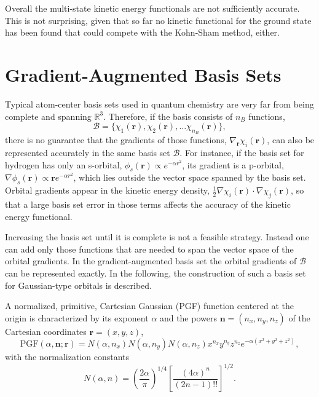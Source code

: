 \documentclass[journal=jacsat,manuscript=article]{achemso}
\renewcommand\vec[1]{\mathbf{#1}}
\begin{document}
Overall the multi-state kinetic energy functionals are not sufficiently accurate. This is not surprising,
given that so far no kinetic functional for the ground state has been found that could compete
with the Kohn-Sham method, either.

\FloatBarrier
\section{Gradient-Augmented Basis Sets}

Typical atom-center basis sets used in quantum chemistry are very far from being complete and spanning $\mathbb{R}^3$. Therefore, if the basis consists of $n_B$ functions,
\begin{equation}
\mathcal{B} = \{ \chi_1(\vec{r}), \chi_2(\vec{r}), \ldots \chi_{n_B}(\vec{r}) \},
\end{equation}
there is no guarantee that the gradients of those functions, $\nabla_{\vec{r}} \chi_i(\vec{r})$,
can also be represented accurately in the same basis set $\mathcal{B}$.
For instance, if the basis set for hydrogen has only an s-orbital, $\phi_s(\vec{r}) \propto e^{-\alpha r^2}$, its gradient is a p-orbital, $\nabla \phi_s(\vec{r}) \propto \vec{r} e^{-\alpha r^2}$, which lies outside the vector space spanned by the basis set.
Orbital gradients appear in the kinetic energy density, $\frac{1}{2} \nabla \chi_i(\vec{r}) \cdot \nabla \chi_j(\vec{r})$, so that a large basis set error in those terms affects the accuracy of the kinetic energy functional.

Increasing the basis set until it is complete is not a feasible strategy. Instead one can add only those functions that are needed to span the vector space of the orbital gradients.
In the gradient-augmented basis set the orbital gradients of $\mathcal{B}$ can be represented exactly. In the following, the construction of such a basis set for Gaussian-type orbitals is described.

A normalized, primitive, Cartesian Gaussian (PGF) function centered at the origin is characterized by its exponent $\alpha$ and the powers $\vec{n} = (n_x, n_y, n_z)$ of the Cartesian coordinates $\vec{r}=(x,y,z)$,
\begin{equation}
  \text{PGF}(\alpha,\vec{n}; \vec{r}) =
  N(\alpha,n_x) N(\alpha,n_y) N(\alpha,n_z) x^{n_x} y^{n_y} z^{n_z} e^{-\alpha (x^2+y^2+z^2)},
  \label{eqn:PGF}
\end{equation}
with the normalization constants \cite{Obara1986}
\begin{equation}
N(\alpha,n) = \left(\frac{2 \alpha}{\pi} \right)^{1/4} \left[\frac{(4 \alpha)^n}{(2 n - 1)!!} \right]^{1/2}.
\end{equation}
\end{document}
